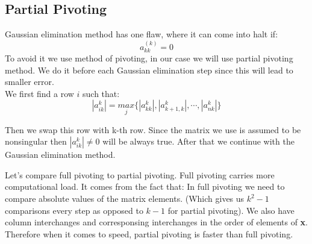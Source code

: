 \newpage
\subsection{Partial Pivoting}
Gaussian elimination method has one flaw, where it can come into halt if:
\[ a_{kk}^{(k)} = 0 \]
To avoid it we use method of pivoting, in our case we will use partial pivoting method.
We do it before each Gaussian elimination step since this will lead to smaller error.
\\We first find a row $i$ such that:
\[ |{a_{ik}^{k}}| = \underset{j}{max} \{ |{a_{kk}^{k}}|, |{a_{k+1, k}^{k}}|, \cdots, |{a_{nk}^{k}}|\} \]

Then we swap this row with k-th row. Since the matrix we use is assumed to be nonsingular then $|{a_{ik}^{k}}| \neq 0$ will be always true. After that we continue with the Gaussian elimination method.

Let's compare full pivoting to partial pivoting.
Full pivoting carries more computational load. It comes from the fact that:
In full pivoting we need to compare absolute values of the matrix elements. (Which gives us $ k^2-1$ comparisons every step as opposed to $k-1$ for partial pivoting). We also have column interchanges and corresponsing interchanges in the order of elements of \textbf{x}.
Therefore when it comes to speed, partial pivoting is faster than full pivoting.

\newpage
